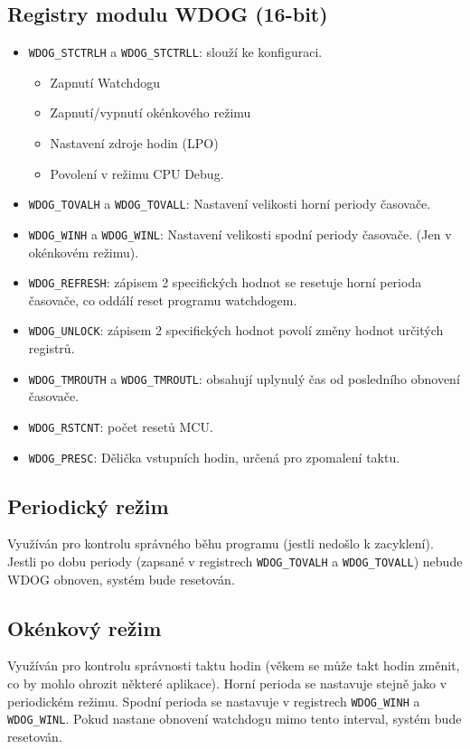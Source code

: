 \documentclass[12pt,a4paper,final]{article}
\begin{document}
\subsection{Registry modulu WDOG (16-bit)}
\begin{itemize}
    \item \verb|WDOG_STCTRLH| a \verb|WDOG_STCTRLL|: slouží ke konfiguraci.
    \begin{itemize}
        \item Zapnutí Watchdogu
        \item Zapnutí/vypnutí okénkového režimu
        \item Nastavení zdroje hodin (LPO)
        \item Povolení v režimu CPU Debug.
    \end{itemize}
    \item \verb|WDOG_TOVALH| a \verb|WDOG_TOVALL|: Nastavení velikosti horní periody časovače.
    \item \verb|WDOG_WINH| a \verb|WDOG_WINL|: Nastavení velikosti spodní periody časovače. (Jen v okénkovém režimu).
    \item \verb|WDOG_REFRESH|: zápisem 2 specifických hodnot se resetuje horní perioda časovače, co oddálí reset programu watchdogem.
    \item \verb|WDOG_UNLOCK|: zápisem 2 specifických hodnot povolí změny hodnot určitých registrů. 
    \item \verb|WDOG_TMROUTH| a \verb|WDOG_TMROUTL|: obsahují uplynulý čas od posledního obnovení časovače.
    \item \verb|WDOG_RSTCNT|: počet resetů MCU.
    \item \verb|WDOG_PRESC|: Dělička vstupních hodin, určená pro zpomalení taktu.
\end{itemize}

\subsection{Periodický režim}
Využíván pro kontrolu správného běhu programu (jestli nedošlo k zacyklení). Jestli po dobu periody (zapsané v registrech \verb|WDOG_TOVALH| a \verb|WDOG_TOVALL|) nebude WDOG obnoven, systém bude resetován.

\subsection{Okénkový režim}
Využíván pro kontrolu správnosti taktu hodin (věkem se může takt hodin změnit, co by mohlo ohrozit některé aplikace). Horní perioda se nastavuje stejně jako v periodickém režimu. Spodní perioda se nastavuje v registrech \verb|WDOG_WINH| a \verb|WDOG_WINL|. Pokud nastane obnovení watchdogu mimo tento interval, systém bude resetován.
\end{document}
